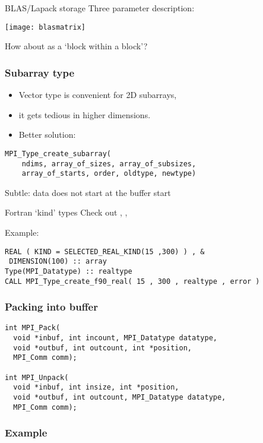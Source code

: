 
\begin{frame}{BLAS/Lapack storage}
  Three parameter description:

  \texttt{[image: blasmatrix]}

  How about as a `block within a block'?
\end{frame}


\begin{frame}[containsverbatim]\frametitle{Subarray type}
  \begin{itemize}
  \item Vector type is convenient for 2D subarrays,
  \item it gets tedious in higher dimensions.
  \item Better solution: 
  \end{itemize}
\begin{lstlisting}
MPI_Type_create_subarray(
    ndims, array_of_sizes, array_of_subsizes,
    array_of_starts, order, oldtype, newtype)  
\end{lstlisting}
Subtle: data does not start at the buffer start
\end{frame}

\begin{exerciseframe}[cubegather]
  
\end{exerciseframe}

\begin{frame}[containsverbatim]{Fortran `kind' types}
  Check out
,
,

Example:
\lstset{language=Fortran}
\begin{lstlisting}
REAL ( KIND = SELECTED_REAL_KIND(15 ,300) ) , &
 DIMENSION(100) :: array
Type(MPI_Datatype) :: realtype
CALL MPI_Type_create_f90_real( 15 , 300 , realtype , error )
\end{lstlisting}
\end{frame}


\begin{frame}[containsverbatim]\frametitle{Packing into buffer}
\lstset{language=C}
\begin{lstlisting}
int MPI_Pack(
  void *inbuf, int incount, MPI_Datatype datatype,
  void *outbuf, int outcount, int *position,
  MPI_Comm comm);

int MPI_Unpack(
  void *inbuf, int insize, int *position,
  void *outbuf, int outcount, MPI_Datatype datatype,
  MPI_Comm comm);
\end{lstlisting}
\end{frame}

\begin{frame}[containsverbatim]\frametitle{Example}
\small
{}
\end{frame}

